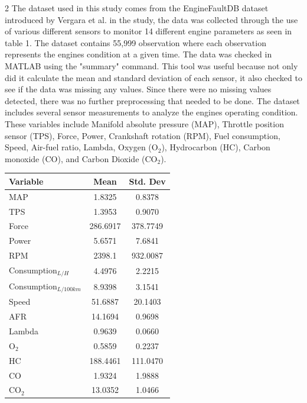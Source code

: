 \documentclass[10pt, letterpaper]{article}
\begin{document}
\begin{multicols}{2}
    The dataset used in this study comes from the EngineFaultDB dataset introduced by Vergara et al. in the study, the data was collected through the use of various different sensors to monitor 14 different engine parameters as seen in table 1. The dataset contains 55,999 observation where each observation represents the engines condition at a given time. The data was checked in MATLAB using the "summary" command. This tool was useful because not only did it calculate the mean and standard deviation of each sensor, it also checked to see if the data was missing any values. Since there were no missing values detected, there was no further preprocessing that needed to be done. 
    The dataset includes several sensor measurements to analyze the engines operating condition. These variables include Manifold absolute pressure (MAP), Throttle position sensor (TPS), Force, Power, Crankshaft rotation (RPM), Fuel consumption, Speed, Air-fuel ratio, Lambda, Oxygen (O$_2$), Hydrocarbon (HC), Carbon monoxide (CO), and Carbon Dioxide (CO$_2$).

\begin{center}
    \label{tab:data_summary}
    \begin{tabular}{lcc}
        \toprule
        \textbf{Variable} & \textbf{Mean} & \textbf{Std. Dev}\\
        \midrule
MAP & 1.8325 & 0.8378 \\
TPS & 1.3953 & 0.9070 \\
Force & 286.6917 & 378.7749 \\
Power & 5.6571 & 7.6841 \\
RPM & 2398.1 & 932.0087 \\
Consumption$_{L/H}$ & 4.4976 & 2.2215 \\
Consumption$_{L/100km}$ & 8.9398 & 3.1541 \\
Speed & 51.6887 & 20.1403 \\
AFR & 14.1694 & 0.9698 \\
Lambda & 0.9639 & 0.0660 \\
O$_2$ & 0.5859 & 0.2237 \\
HC & 188.4461 & 111.0470 \\
CO & 1.9324 & 1.9888 \\
CO$_2$ & 13.0352 & 1.0466 \\
        \bottomrule
    \end{tabular}
\end{center}

\end{multicols}
\end{document}
